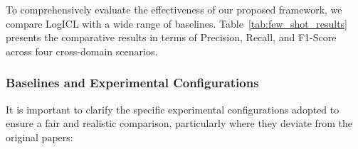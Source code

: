 \documentclass[lettersize,journal]{IEEEtran}
\begin{document}
To comprehensively evaluate the effectiveness of our proposed framework, we compare LogICL with a wide range of baselines. Table~\ref{tab:few_shot_results} presents the comparative results in terms of Precision, Recall, and F1-Score across four cross-domain scenarios.

\subsubsection{Baselines and Experimental Configurations}
It is important to clarify the specific experimental configurations adopted to ensure a fair and realistic comparison, particularly where they deviate from the original papers:
\end{document}
